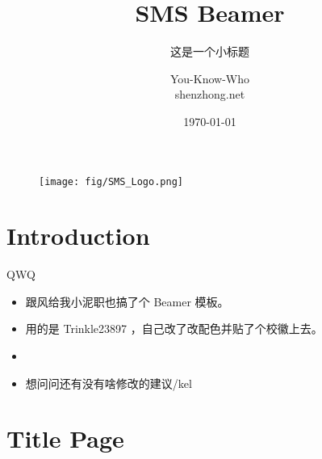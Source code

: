 \documentclass{beamer}
\author[张宸睿]{You-Know-Who \\ \small shenzhong.net}
\title{SMS Beamer}
\subtitle{这是一个小标题}
\institute{SMS}
\date{\today}
\begin{document}
\begin{frame}
    \titlepage
    \begin{figure}[htpb]
        \begin{center}
            \texttt{[image: fig/SMS\_Logo.png]}
        \end{center}
    \end{figure}
\end{frame}

\begin{frame}
    \tableofcontents[sectionstyle=show,subsectionstyle=show/shaded/hide,subsubsectionstyle=show/shaded/hide]
\end{frame}

\section{Introduction}

\begin{frame}{QWQ}
    \begin{itemize}
        \item 跟风给我小泥职也搞了个 Beamer 模板。
        \item 用的是 Trinkle23897 \href{https://github.com/tuna/THU-Beamer-Theme}{\color{red}{THU 的板子}}，自己改了改配色并贴了个校徽上去。
        \item \href{https://www.overleaf.com/project/62bbf93537d96cd648f236f8}{\color{red}{Overleaf 项目地址}}
        \item 想问问还有没有啥修改的建议/kel
    \end{itemize}
\end{frame}

\section{Title Page}

\begin{frame}{}
    
\end{frame}
\end{document}
